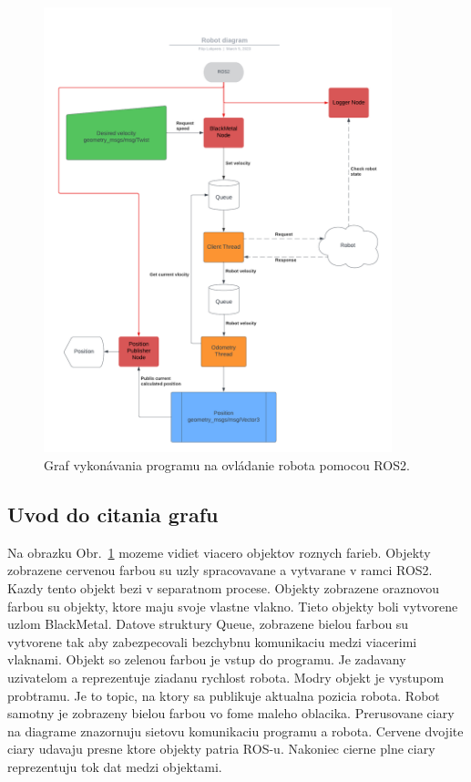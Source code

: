 \begin{figure}[!htbp]
	\begin{center}
		\includegraphics[width=0.9\textwidth]{img/BlackMetal_flowchart.png}
	\end{center}
	\caption{Graf vykonávania programu na ovládanie robota pomocou ROS2.}
	\label{fig:flowchart}
\end{figure}

\subsection{Uvod do citania grafu}
\label{sec:citanie_grafu}

Na obrazku Obr.~\ref{fig:flowchart} mozeme vidiet viacero objektov roznych farieb. Objekty zobrazene cervenou farbou su uzly spracovavane
a vytvarane v ramci ROS2. Kazdy tento objekt bezi v separatnom procese. Objekty zobrazene oraznovou farbou su objekty, ktore maju svoje
vlastne vlakno. Tieto objekty boli vytvorene uzlom BlackMetal. Datove struktury Queue, zobrazene bielou farbou su vytvorene  tak aby
zabezpecovali bezchybnu komunikaciu medzi viacerimi vlaknami. Objekt so zelenou farbou je vstup do programu. Je zadavany uzivatelom
a reprezentuje ziadanu rychlost robota. Modry objekt je vystupom probtramu. Je to topic, na ktory sa publikuje aktualna pozicia robota.
Robot samotny je zobrazeny bielou farbou vo fome maleho oblacika. Prerusovane ciary na diagrame znazornuju sietovu komunikaciu programu
a robota. Cervene dvojite ciary udavaju presne ktore objekty patria ROS-u. Nakoniec cierne plne ciary reprezentuju tok dat medzi objektami.

